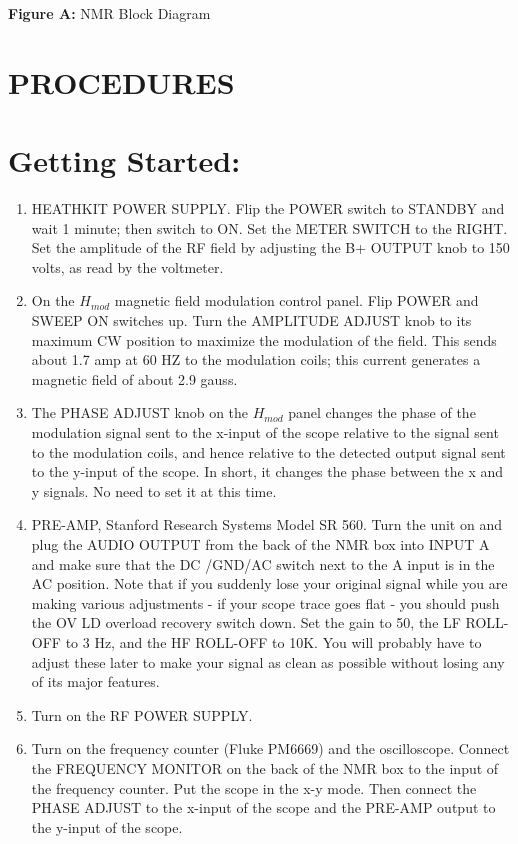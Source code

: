 \documentclass{../lab}
\begin{document}
\textbf{Figure A:} NMR Block Diagram\section{PROCEDURES}

\section{Getting Started:}

\begin{enumerate}
    \item HEATHKIT POWER SUPPLY. Flip the POWER switch to STANDBY and wait 1 minute; then switch to ON. Set the METER SWITCH to the RIGHT. Set the amplitude of the RF field by adjusting the B+ OUTPUT knob to 150 volts, as read by the voltmeter.

    \item On the $H_{mod}$ magnetic field modulation control panel. Flip POWER and SWEEP ON switches up. Turn the AMPLITUDE ADJUST knob to its maximum CW position to maximize the modulation of the field. This sends about 1.7 amp at 60 HZ to the modulation coils; this current generates a magnetic field of about 2.9 gauss.

    \item The PHASE ADJUST knob on the $ H_{mod}$ panel changes the phase of the modulation signal sent to the x-input of the scope relative to the signal sent to the modulation coils, and hence relative to the detected output signal sent to the y-input of the scope. In short, it changes the phase between the x and y signals. No need to set it at this time.

    \item PRE-AMP, Stanford Research Systems Model SR 560. Turn the unit on and plug the AUDIO OUTPUT from the back of the NMR box into INPUT A and make sure that the DC /GND/AC switch next to the A input is in the AC position. Note that if you suddenly lose your original signal while you are making various adjustments - if your scope trace goes flat - you should push the OV LD overload recovery switch down. Set the gain to 50, the LF ROLL-OFF to 3 Hz, and the HF ROLL-OFF to 10K. You will probably have to adjust these later to make your signal as clean as possible without losing any of its major features.

    \item Turn on the RF POWER SUPPLY.

    \item Turn on the frequency counter (Fluke PM6669) and the oscilloscope. Connect the FREQUENCY MONITOR on the back of the NMR box to the input of the frequency counter. Put the scope in the x-y mode. Then connect the PHASE ADJUST to the x-input of the scope and the PRE-AMP output to the y-input of the scope.


\end{enumerate}
\end{document}
